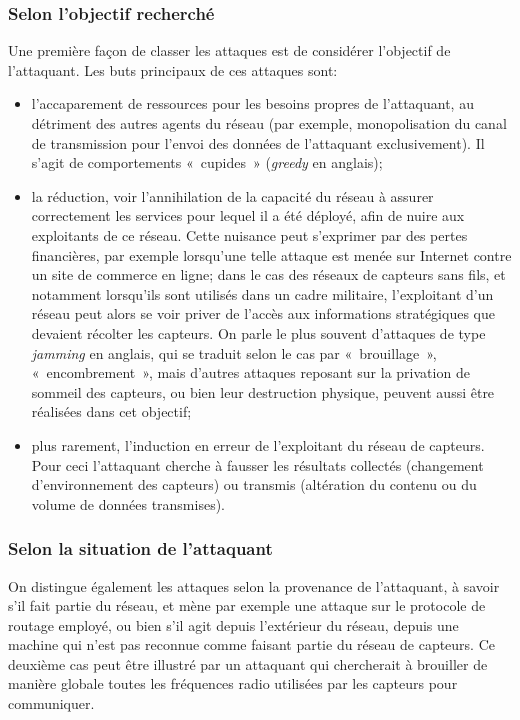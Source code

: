 \subsubsection{Selon l'objectif recherché}
Une première façon de classer les attaques est de considérer l'objectif de l'attaquant.
Les buts principaux de ces attaques sont:
\begin{itemize}
    \item l'accaparement de ressources pour les besoins propres de l'attaquant, au détriment des autres agents du réseau (par exemple, monopolisation du canal de transmission pour l'envoi des données de l'attaquant exclusivement). Il s'agit de comportements « cupides » (\textit{greedy} en anglais);
    \item la réduction, voir l'annihilation de la capacité du réseau à assurer correctement les services pour lequel il a été déployé, afin de nuire aux exploitants de ce réseau. Cette nuisance peut s'exprimer par des pertes financières, par exemple lorsqu'une telle attaque est menée sur Internet contre un site de commerce en ligne; dans le cas des réseaux de capteurs sans fils, et notamment lorsqu'ils sont utilisés dans un cadre militaire, l'exploitant d'un réseau peut alors se voir priver de l'accès aux informations stratégiques que devaient récolter les capteurs. On parle le plus souvent d'attaques de type \textit{jamming} en anglais, qui se traduit selon le cas par « brouillage », « encombrement », mais d'autres attaques reposant sur la privation de sommeil des capteurs, ou bien leur destruction physique, peuvent aussi être réalisées dans cet objectif;
    \item plus rarement, l'induction en erreur de l'exploitant du réseau de capteurs. Pour ceci l'attaquant cherche à fausser les résultats collectés (changement d'environnement des capteurs) ou transmis (altération du contenu ou du volume de données transmises).
\end{itemize}

\subsubsection{Selon la situation de l'attaquant}
On distingue également les attaques selon la provenance de l'attaquant, à savoir s'il fait partie du réseau, et mène par exemple une attaque sur le protocole de routage employé, ou bien s'il agit depuis l'extérieur du réseau, depuis une machine qui n'est pas reconnue comme faisant partie du réseau de capteurs.
Ce deuxième cas peut être illustré par un attaquant qui chercherait à brouiller de manière globale toutes les fréquences radio utilisées par les capteurs pour communiquer.

